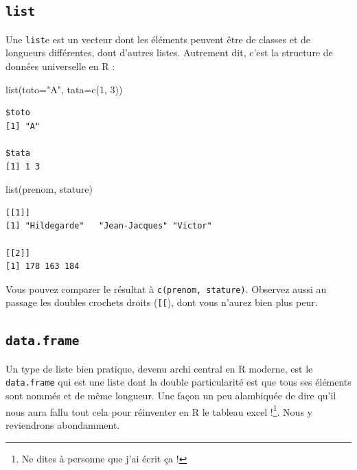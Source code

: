 \documentclass[
  letterpaper,
  DIV=11,
  numbers=noendperiod]{scrreprt}
\newenvironment{Shaded}{\begin{snugshade}}{\end{snugshade}}
\newcommand{\AttributeTok}[1]{\textcolor[rgb]{0.40,0.45,0.13}{#1}}
\newcommand{\DecValTok}[1]{\textcolor[rgb]{0.68,0.00,0.00}{#1}}
\newcommand{\FunctionTok}[1]{\textcolor[rgb]{0.28,0.35,0.67}{#1}}
\newcommand{\NormalTok}[1]{\textcolor[rgb]{0.00,0.23,0.31}{#1}}
\newcommand{\StringTok}[1]{\textcolor[rgb]{0.13,0.47,0.30}{#1}}
\begin{document}
\hypertarget{list}{%
\subsection{\texorpdfstring{\texttt{list}}{list}}\label{list}}

Une \texttt{list}e est un vecteur dont les éléments peuvent être de
classes et de longueurs différentes, dont d'autres listes. Autrement
dit, c'est la structure de données universelle en R :

\begin{Shaded}
\begin{Highlighting}[]
\FunctionTok{list}\NormalTok{(}\AttributeTok{toto=}\StringTok{"A"}\NormalTok{, }\AttributeTok{tata=}\FunctionTok{c}\NormalTok{(}\DecValTok{1}\NormalTok{, }\DecValTok{3}\NormalTok{))}
\end{Highlighting}
\end{Shaded}

\begin{verbatim}
$toto
[1] "A"

$tata
[1] 1 3
\end{verbatim}

\begin{Shaded}
\begin{Highlighting}[]
\FunctionTok{list}\NormalTok{(prenom, stature)}
\end{Highlighting}
\end{Shaded}

\begin{verbatim}
[[1]]
[1] "Hildegarde"   "Jean-Jacques" "Victor"      

[[2]]
[1] 178 163 184
\end{verbatim}

Vous pouvez comparer le résultat à \texttt{c(prenom,\ stature)}.
Observez aussi au passage les doubles crochets droits (\texttt{{[}{[}}),
dont vous n'aurez bien plus peur.

\hypertarget{data.frame}{%
\subsection{\texorpdfstring{\texttt{data.frame}}{data.frame}}\label{data.frame}}

Un type de liste bien pratique, devenu archi central en R moderne, est
le \texttt{data.frame} qui est une liste dont la double particularité
est que tous ses éléments sont nommés et de même longueur. Une façon un
peu alambiquée de dire qu'il nous aura fallu tout cela pour réinventer
en R le tableau excel !\footnote{Ne dites à personne que j'ai écrit ça !}.
Nous y reviendrons abondamment.
\end{document}
